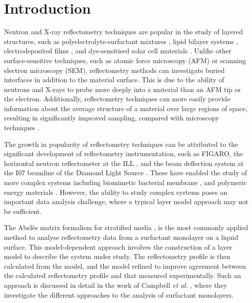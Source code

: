 \documentclass[amsmath,amssymb,twocolumn,superscriptaddress]{revtex4-1}
\begin{document}
\maketitle                        %

\section{Introduction}

Neutron and X-ray reflectometry techniques are popular in the study of
layered structures, such as polyelectrolyte-surfactant
mixtures \cite{llamas_study_2018}, lipid bilayer
systems \cite{waldie_localization_2018}, electrodeposited
films \cite{beebee_effect_2019}, and dye-sensitised solar cell
materials \cite{mccree-grey_preferred_2015}.
Unlike other surface-sensitive techniques, such as atomic force microscopy
(AFM) or scanning electron microscopy (SEM), reflectometry methods can
investigate buried interfaces in addition to the material surface.
This is due to the ability of neutrons and X-rays to probe more deeply into
a material than an AFM tip or the electron.
Additionally, reflectometry techniques can more easily provide information
about the average structure of a material over large regions of space,
resulting in significantly improved sampling, compared with microscopy
techniques \cite{renaud_probing_2009}.

The growth in popularity of reflectometry techniques can be attributed to
the significant development of reflectometry instrumentation, such as
FIGARO, the horizontal neutron reflectometer at the
ILL \cite{campbell_figaro_2011}, and the beam deflection system at the I07
beamline of the Diamond Light Source \cite{arnold_implementation_2012}.
These have enabled the study of more complex systems including biomimetic
bacterial membrane \cite{barker_neutron_2016}, and polymeric energy
materials \cite{khodakarimi_x-ray_2016}.
However, the ability to study complex systems poses an important data
analysis challenge, where a typical layer model approach may not be
sufficient.

The Abel\`{e}s matrix formalism for stratified media \cite{abeles_sur_1948}, is
the most commonly applied method to analyse reflectometry data from a
surfactant monolayer on a liquid surface.
This model-dependent approach involves the construction of a layer model to
describe the system under study.
The reflectometry profile is then calculated from the model, and the model
refined to improve agreement between the calculated reflectometry profile
and that measured experimentally.
Such an approach is discussed in detail in the work of
Campbell \emph{et al.} \cite{campbell_structure_2018}, where they investigate
the different approaches to the analysis of surfactant monolayers.
\end{document}
